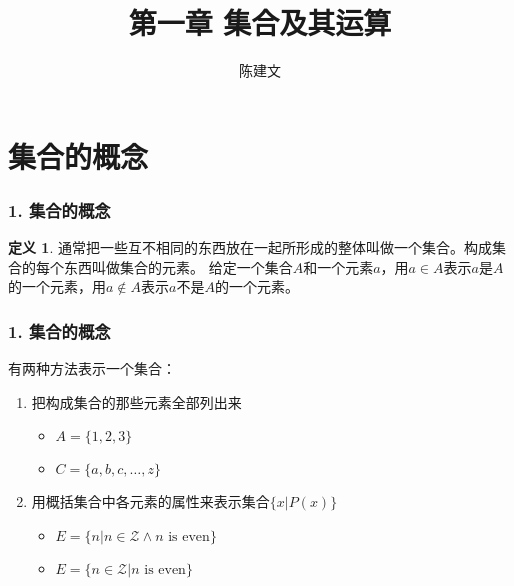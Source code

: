\documentclass{beamer}
\begin{document}
\begin{CJK*}{UTF8}{gbsn}

\newtheorem{Thm}{定理}[section]
\theoremstyle{definition}
\newtheorem{Def}{定义}[section]
\theoremstyle{example}
\newtheorem*{Ex}{例：}
\newtheorem{Exercise}{习题}
\newtheorem*{Thm3.1}{定理3.1}

\date{}
\author{陈建文}

\title{第一章 集合及其运算}
\begin{frame}
  \titlepage
\end{frame}  
\section{集合的概念}
\begin{frame}
  \frametitle{1. 集合的概念}
  \begin{Def}
    通常把一些互不相同的东西放在一起所形成的整体叫做一个\alert{集合}。构成集合的每个东西叫做集合的\alert{元素}。
给定一个集合$A$和一个元素$a$，用\alert{$a \in A$}表示$a$是$A$的一个元素，用\alert{$a \notin A$}表示$a$不是$A$的一个元素。
  \end{Def}
\end{frame}

\begin{frame}
  \frametitle{1. 集合的概念}

有两种方法表示一个集合：
\begin{enumerate}
\item 把构成集合的那些元素全部列出来
  \begin{itemize}
\pause
  \item $A = \{1, 2, 3\}$
\pause
\item $C = \{a, b, c, \ldots, z\}$
  \end{itemize}
\pause
\item 用概括集合中各元素的属性来表示集合$\{x|P(x)\}$
\begin{itemize}
\pause
\item $E = \{n|n \in \mathcal{Z} \land n\text{ is even}\}$
\pause
\item $E = \{n \in \mathcal{Z} | n\text{ is even}\}$
\end{itemize}
\end{enumerate}


\end{frame}


\end{CJK*}
\end{document}
